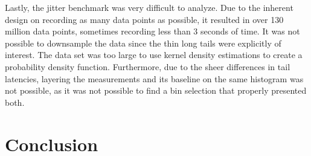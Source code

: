 Lastly, the jitter benchmark was very difficult to analyze. Due to the inherent design on recording as many data points as possible, it resulted in over 130 million data points, sometimes recording less than 3 seconds of time. It was not possible to downsample the data since the thin long tails were explicitly of interest. The data set was too large to use kernel density estimations to create a probability density function. Furthermore, due to the sheer differences in tail latencies, layering the measurements and its baseline on the same histogram was not possible, as it was not possible to find a bin selection that properly presented both.

\section{Conclusion}
